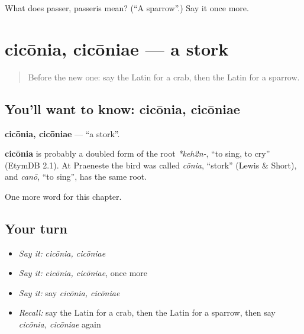 \begin{tcolorbox}[breakable,colback=teal!4,colframe=teal!35!black,title={Before you move on}]
What does passer, passeris mean? (\textquotedblleft{}A sparrow\textquotedblright{}.) Say it once more.
\end{tcolorbox}
\section[cicōnia, cicōniae]{cicōnia, cicōniae — a stork}

\label{lesson:LA-C192-ciconia}



\begin{quote}
Before the new one: say the Latin for a crab, then the Latin for a sparrow.
\end{quote}

\subsection*{You'll want to know: cicōnia, cicōniae}
\textbf{cicōnia, cicōniae} — \textquotedblleft{}a stork\textquotedblright{}.

\begin{cousinweb}
\textbf{cicōnia} is probably a doubled form of the root \emph{*keh2n-}, \textquotedblleft{}to sing, to cry\textquotedblright{} (EtymDB 2.1). At Praeneste the bird was called \emph{cōnia}, \textquotedblleft{}stork\textquotedblright{} (Lewis \& Short), and \emph{canō}, \textquotedblleft{}to sing\textquotedblright{}, has the same root.
\end{cousinweb}

\begin{grammarlens}[title={What you've built}]
One more word for this chapter.
\end{grammarlens}

\subsection*{Your turn}
\begin{itemize}
\raggedright
  \item \emph{Say it:} \emph{cicōnia, cicōniae}
  \item \emph{Say it:} \emph{cicōnia, cicōniae}, once more
  \item \emph{Say it:} say \emph{cicōnia, cicōniae}
  \item \emph{Recall:} say the Latin for a crab, then the Latin for a sparrow, then say \emph{cicōnia, cicōniae} again
\end{itemize}

